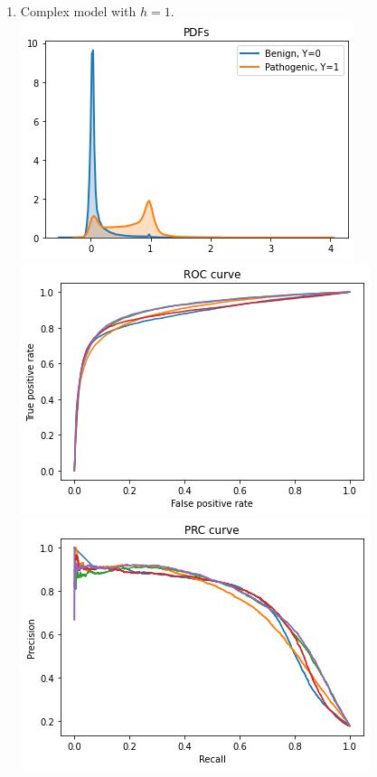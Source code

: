 \documentclass[twoside]{article}
\begin{document}
\begin{enumerate}
		\item Complex model with $h = 1$.\\
		\includegraphics[scale=0.7]{res/img/c1pdf.png}\\
		\includegraphics[scale=0.7]{res/img/c1roc.png}\\
		\includegraphics[scale=0.7]{res/img/c1prc.png}\\
		

\end{enumerate}
\end{document}
